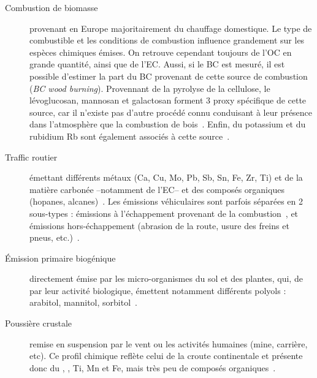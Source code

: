 \begin{description}
    \item[Combustion de biomasse] provenant en Europe majoritairement du chauffage
        domestique. Le type de combustible et les conditions de combustion influence
        grandement sur les espèces chimiques émises. On retrouve cependant toujours de
        l'OC en grande quantité, ainsi que de l'EC. Aussi, si le BC est mesuré, il est
        possible d'estimer la part du BC provenant de cette source de combustion \BCwb{}
        (\textit{BC wood burning}).
        Provennant de la pyrolyse de la cellulose, le lévoglucosan, mannosan et
        galactosan forment 3 proxy spécifique de cette source, car il n'existe pas d'autre
        procédé connu conduisant à leur présence dans l'atmosphère que la combustion de
        bois~\autocite{jordanLevoglucosan2006,puxbaumLevoglucosan2007}.
        Enfin, du potassium  et du rubidium Rb sont également associés à cette
        source~\autocite{navaBiomass2015,gollyEtude2014,chevrierChauffage2016}.

    \item[Traffic routier] émettant différents métaux (Ca, Cu, Mo, Pb, Sb, Sn, Fe, Zr,
        Ti) et de la matière carbonée --notamment de l'EC-- et des composés organiques
        (hopanes, alcanes)~\autocite{schauerCharacterization2006,charronIdentification2019}. Les émissions
        véhiculaires sont parfois séparées en 2 sous-types : émissions à l'échappement
        provenant de la combustion~\autocite{allenSize2001,huMetals2009,vianaSource2008},
        et émissions hors-échappement (abrasion de la route, usure des freins et pneus,
        etc.)~\autocite{grigoratosBrake2015,sandersAirborne2003,sternbeckMetal2002}.

    \item[Émission primaire biogénique] directement émise par les micro-organismes du sol
        et des plantes, qui, de par leur activité biologique, émettent notamment
        différents polyols : arabitol, mannitol,
        sorbitol~\autocite{bauerSignificant2008,yttriAmbient2007,samakePolyols2019}.

    \item[Poussière crustale] remise en suspension par le vent ou les activités humaines
        (mine, carrière, etc). Ce profil chimique reflète celui de la croute continentale
        et présente donc du , , Ti, Mn et Fe, mais très peu de composés
        organiques~\autocite{almeidaSource2005,dallostoHourly2013,morenoVariations2011,putaudSizesegregated2004}.


\end{description}

